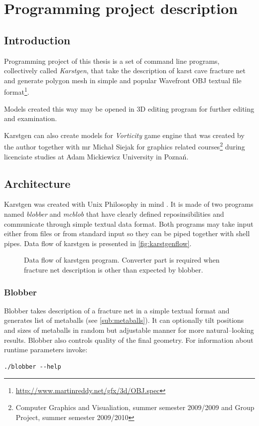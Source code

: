 \chapter{Programming project description}
\label{chap:project}
\section{Introduction}

Programming project of this thesis is a set of command line programs, collectively
called \emph{Karstgen}, that take
the description of karst cave fracture net and generate polygon mesh in
simple and popular Wavefront OBJ textual file format\footnote{\url{http://www.martinreddy.net/gfx/3d/OBJ.spec}}.

Models created this way may be opened in 3D editing program for further editing
and examination.

Karstgen can also create models for \emph{Vorticity} game engine that was created
by the author together with mr Michał Siejak for graphics related courses\footnote{Computer
  Graphics and Visualiation, summer semester 2009/2009 and Group Project, summer
semester 2009/2010} during licenciate studies at Adam Mickiewicz University in
Poznań.

\section{Architecture}

Karstgen was created with Unix Philosophy in mind \parencite{raymond2003art}.
It is made of two programs named \emph{blobber} and \emph{mcblob} that have
clearly defined reposinsibilities and communicate through simple textual data
format.  Both programs may take input either from files or from standard input
so they can be piped together with shell pipes. Data flow of karstgen is
presented in \autoref{fig:karstgenflow}.
\begin{figure}[ht]
  \begin{center}
    
  \end{center}
  \caption{Data flow of karstgen program. Converter part is required when fracture
  net description is other than expected by blobber.}
  \label{fig:karstgenflow}
\end{figure}

\subsection{Blobber}
Blobber takes description of a fracture net in a simple textual format and
generates list of metaballs (see \autoref{sub:metaballs}). It can
optionally tilt positions and sizes of metaballs in random but adjustable manner
for more natural--looking results. Blobber also controls quality of the final
geometry. For information about runtime parameters invoke:
\begin{verbatim}
./blobber --help
\end{verbatim}

